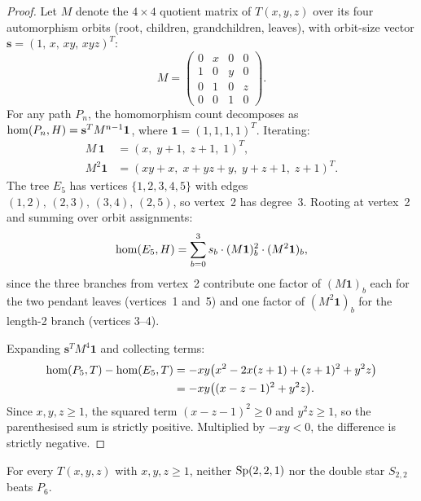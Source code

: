 \begin{proof}
  Let $M$ denote the $4 \times 4$ quotient matrix of $T(x,y,z)$
  over its four automorphism orbits (root, children, grandchildren,
  leaves), with orbit-size vector
  $\mathbf{s} = (1,\, x,\, xy,\, xyz)^T$:
  \[
    M = \begin{pmatrix} 0&x&0&0 \\ 1&0&y&0 \\
    0&1&0&z \\ 0&0&1&0 \end{pmatrix}.
  \]
  For any path $P_n$, the homomorphism count decomposes as
  $\mathrm{hom}(P_n, H) = \mathbf{s}^T M^{n-1} \mathbf{1}$,
  where $\mathbf{1} = (1,1,1,1)^T$. Iterating:
  \begin{align*}
    M\,\mathbf{1} &= (x,\; y+1,\; z+1,\; 1)^T, \\
    M^2\mathbf{1} &= (xy+x,\; x+yz+y,\; y+z+1,\; z+1)^T.
  \end{align*}
  The tree $E_5$ has vertices $\{1,2,3,4,5\}$ with edges
  $(1,2),\,(2,3),\,(3,4),\,(2,5)$, so vertex~2 has degree~3. Rooting
  at vertex~2 and summing over orbit assignments:
  \[
    \mathrm{hom}(E_5, H) = \sum_{b=0}^{3}
      s_b \cdot (M\mathbf{1})_b^2 \cdot (M^2\mathbf{1})_b,
  \]
  since the three branches from vertex~2 contribute
  one factor of $(M\mathbf{1})_b$ each for the two pendant
  leaves (vertices~1 and~5) and one factor of
  $(M^2\mathbf{1})_b$ for the length-2 branch (vertices 3--4).

  Expanding $\mathbf{s}^T M^4 \mathbf{1}$ and collecting terms:
  \begin{align*}
    \mathrm{hom}(P_5, T) - \mathrm{hom}(E_5, T)
    &= -xy\bigl(x^2 - 2x(z+1) + (z+1)^2 + y^2 z\bigr) \\
    &= -xy\bigl((x - z - 1)^2 + y^2 z\bigr).
  \end{align*}
  Since $x, y, z \ge 1$, the squared term
  $(x - z - 1)^2 \ge 0$ and $y^2 z \ge 1$, so the
  parenthesised sum is strictly positive. Multiplied by $-xy < 0$,
  the difference is strictly negative.
\end{proof}

\begin{proposition}
  \label{prop:n6-two-trees}
  For every $T(x,y,z)$ with $x,y,z\ge1$, neither
  $\operatorname{Sp}(2,2,1)$ nor the double star $S_{2,2}$ beats $P_6$.
\end{proposition}

